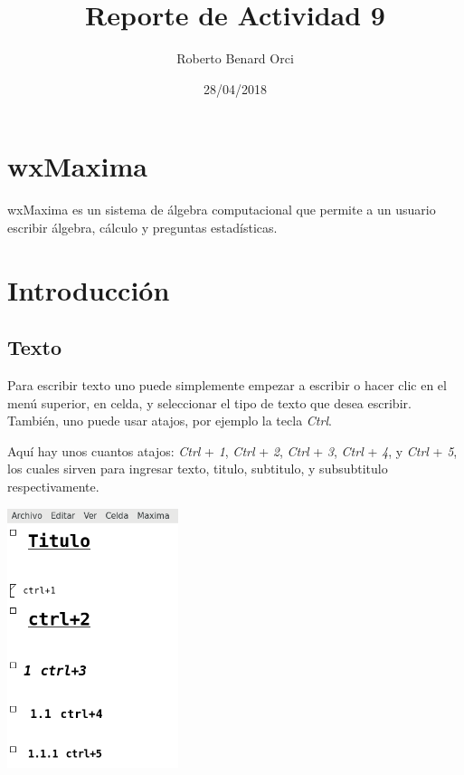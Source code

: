 \documentclass{article}
\title{Reporte de Actividad 9}
\author{Roberto Benard Orci}
\date{28/04/2018}
\begin{document}
\maketitle

\section*{wxMaxima}

wxMaxima es un sistema de álgebra computacional que permite a un usuario escribir
álgebra, cálculo y preguntas estadísticas.

\section{Introducción}

\subsection{Texto}

Para escribir texto uno puede simplemente empezar a escribir o hacer clic en el menú superior, en celda, y seleccionar el tipo de texto que desea escribir. También, uno puede usar atajos, por ejemplo la tecla \textit{Ctrl}.

Aquí hay unos cuantos atajos: \textit{Ctrl} + \textit{1}, \textit{Ctrl} + \textit{2}, \textit{Ctrl} + \textit{3}, \textit{Ctrl} + \textit{4}, y \textit{Ctrl} + \textit{5}, los cuales sirven para ingresar texto, titulo, subtitulo, y subsubtitulo respectivamente.

\begin{center}
	\includegraphics[width=5cm]{texto.png}
    
\end{center}
\vspace{0.3cm}
\end{document}
